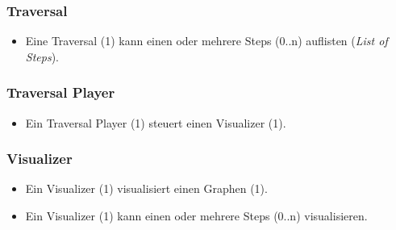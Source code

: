 \subsubsection{Traversal}
\label{subsubsec:Traversal}
\begin{itemize}
  \item Eine Traversal (1) kann einen oder mehrere Steps (0..n) auflisten (\textit{List of Steps}).
\end{itemize}

\subsubsection{Traversal Player}
\label{subsubsec:Traversal Player}
\begin{itemize}
  \item Ein Traversal Player (1) steuert einen Visualizer (1).
\end{itemize}

\subsubsection{Visualizer}
\label{subsubsec:Visualizer}
\begin{itemize}
  \item Ein Visualizer (1) visualisiert einen Graphen (1).
  \item Ein Visualizer (1) kann einen oder mehrere Steps (0..n) visualisieren.
\end{itemize}